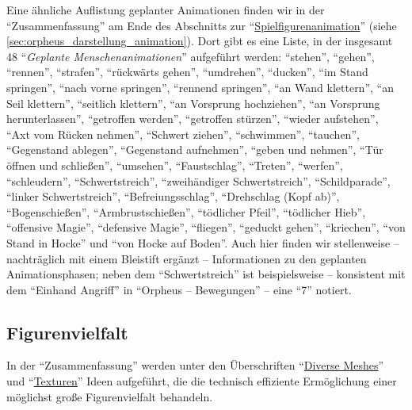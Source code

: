 \documentclass[a5paper,pagesize]{scrbook}
\begin{document}
Eine ähnliche Auflistung geplanter Animationen finden wir in der \enquote{Zusammenfassung} am Ende des Abschnitts zur \enquote{\uline{Spielfigurenanimation}} (siehe \autoref{sec:orpheus_darstellung_animation}).
Dort gibt es eine Liste, in der insgesamt 48 \enquote{\textit{Geplante Menschenanimationen}} aufgeführt werden:
\enquote{stehen}, \enquote{gehen}, \enquote{rennen}, \enquote{strafen}, \enquote{rückwärts gehen}, \enquote{umdrehen}, \enquote{ducken}, \enquote{im Stand springen}, \enquote{nach vorne springen}, \enquote{rennend springen}, \enquote{an Wand klettern}, \enquote{an Seil klettern}, \enquote{seitlich klettern}, \enquote{an Vorsprung hochziehen}, \enquote{an Vorsprung herunterlassen}, \enquote{getroffen werden}, \enquote{getroffen stürzen}, \enquote{wieder aufstehen}, \enquote{Axt vom Rücken nehmen}, \enquote{Schwert ziehen}, \enquote{schwimmen}, \enquote{tauchen}, \enquote{Gegenstand ablegen}, \enquote{Gegenstand aufnehmen}, \enquote{geben und nehmen}, \enquote{Tür öffnen und schließen}, \enquote{umsehen}, \enquote{Faustschlag}, \enquote{Treten}, \enquote{werfen}, \enquote{schleudern}, \enquote{Schwertstreich}, \enquote{zweihändiger Schwertstreich}, \enquote{Schildparade}, \enquote{linker Schwertstreich}, \enquote{Befreiungsschlag}, \enquote{Drehschlag (Kopf ab)}, \enquote{Bogenschießen}, \enquote{Armbrustschießen}, \enquote{tödlicher Pfeil}, \enquote{tödlicher Hieb}, \enquote{offensive Magie}, \enquote{defensive Magie}, \enquote{fliegen}, \enquote{geduckt gehen}, \enquote{kriechen}, \enquote{von Stand in Hocke} und \enquote{von Hocke auf Boden}.
Auch hier finden wir stellenweise -- nachträglich mit einem Bleistift ergänzt -- Informationen zu den geplanten Animationsphasen; neben dem \enquote{Schwertstreich} ist beispielsweise -- konsistent mit dem \enquote{Einhand Angriff} in \enquote{Orpheus -- Bewegungen} -- eine \enquote{7} notiert.


\subsection{Figurenvielfalt}\label{sec:orpheus_darstellung_figurenvielfalt}
In der \enquote{Zusammenfassung} werden unter den Überschriften \enquote{\uline{Diverse Meshes}} und \enquote{\uline{Texturen}} Ideen aufgeführt, die die technisch effiziente Ermöglichung einer möglichst große Figurenvielfalt behandeln.
\end{document}
